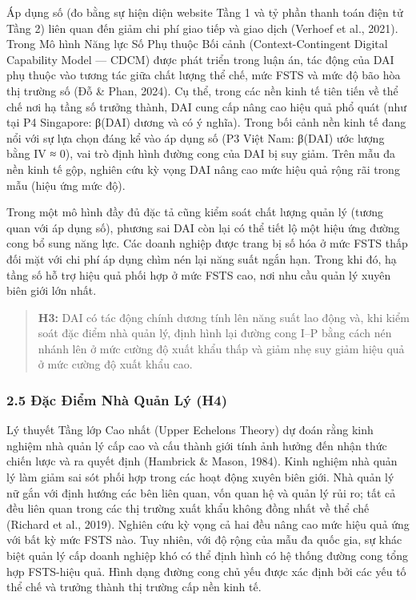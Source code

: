 \documentclass[12pt,a4paper]{article}
\begin{document}
Áp dụng số (đo bằng sự hiện diện website Tầng 1 và tỷ phần thanh toán
điện tử Tầng 2) liên quan đến giảm chi phí giao tiếp và giao dịch
(Verhoef et al., 2021). Trong Mô hình Năng lực Số Phụ thuộc Bối cảnh
(Context-Contingent Digital Capability Model --- CDCM) được phát triển
trong luận án, tác động của DAI phụ thuộc vào tương tác giữa chất lượng
thể chế, mức FSTS và mức độ bão hòa thị trường số (Đỗ \& Phan, 2024). Cụ
thể, trong các nền kinh tế tiên tiến về thể chế nơi hạ tầng số trưởng
thành, DAI cung cấp nâng cao hiệu quả phổ quát (như tại P4 Singapore:
β(DAI) dương và có ý nghĩa). Trong bối cảnh nền kinh tế đang nổi với sự
lựa chọn đáng kể vào áp dụng số (P3 Việt Nam: β(DAI) ước lượng bằng IV ≈
0), vai trò định hình đường cong của DAI bị suy giảm. Trên mẫu đa nền
kinh tế gộp, nghiên cứu kỳ vọng DAI nâng cao mức hiệu quả rộng rãi trong
mẫu (hiệu ứng mức độ).

Trong một mô hình đầy đủ đặc tả cũng kiểm soát chất lượng quản lý (tương
quan với áp dụng số), phương sai DAI còn lại có thể tiết lộ một hiệu ứng
đường cong bổ sung năng lực. Các doanh nghiệp được trang bị số hóa ở mức
FSTS thấp đối mặt với chi phí áp dụng chìm nén lại năng suất ngắn hạn.
Trong khi đó, hạ tầng số hỗ trợ hiệu quả phối hợp ở mức FSTS cao, nơi
nhu cầu quản lý xuyên biên giới lớn nhất.

\begin{quote}
\textbf{H3:} DAI có tác động chính dương tính lên năng suất lao động và,
khi kiểm soát đặc điểm nhà quản lý, định hình lại đường cong I--P bằng
cách nén nhánh lên ở mức cường độ xuất khẩu thấp và giảm nhẹ suy giảm
hiệu quả ở mức cường độ xuất khẩu cao.
\end{quote}

\hypertarget{25-ux111ux1eb7c-ux111iux1ec3m-nhuxe0-quux1ea3n-luxfd-h4}{%
\subsubsection{2.5 Đặc Điểm Nhà Quản Lý
(H4)}\label{25-ux111ux1eb7c-ux111iux1ec3m-nhuxe0-quux1ea3n-luxfd-h4}}

Lý thuyết Tầng lớp Cao nhất (Upper Echelons Theory) dự đoán rằng kinh
nghiệm nhà quản lý cấp cao và cấu thành giới tính ảnh hưởng đến nhận
thức chiến lược và ra quyết định (Hambrick \& Mason, 1984). Kinh nghiệm
nhà quản lý làm giảm sai sót phối hợp trong các hoạt động xuyên biên
giới. Nhà quản lý nữ gắn với định hướng các bên liên quan, vốn quan hệ
và quản lý rủi ro; tất cả đều liên quan trong các thị trường xuất khẩu
không đồng nhất về thể chế (Richard et al., 2019). Nghiên cứu kỳ vọng cả
hai đều nâng cao mức hiệu quả ứng với bất kỳ mức FSTS nào. Tuy nhiên,
với độ rộng của mẫu đa quốc gia, sự khác biệt quản lý cấp doanh nghiệp
khó có thể định hình có hệ thống đường cong tổng hợp FSTS-hiệu quả. Hình
dạng đường cong chủ yếu được xác định bởi các yếu tố thể chế và trưởng
thành thị trường cấp nền kinh tế.
\end{document}

